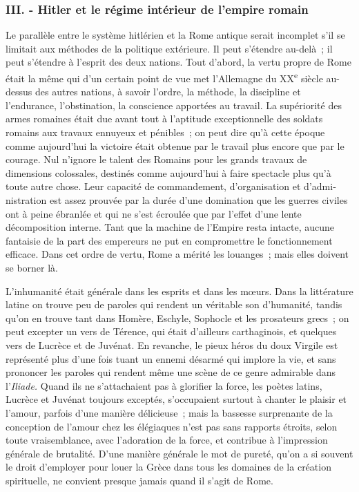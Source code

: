 \documentclass[french,twoside]{book} %
\begin{document}
\subsubsection[{III. - Hitler et le régime intérieur de l'empire romain}]{III. - Hitler et le régime intérieur de l'empire romain}
\noindent \par
Le parallèle entre le système hitlérien et la Rome antique serait incomplet s'il se limitait aux méthodes de la politique extérieure. Il peut s'étendre au-delà ; il peut s'étendre à l'esprit des deux nations. Tout d'abord, la vertu propre de Rome était la même qui d'un certain point de vue met l'Allemagne du XX\textsuperscript{e} siècle au-dessus des autres nations, à savoir l'ordre, la méthode, la discipline et l'endurance, l'obstination, la conscience apportées au travail. La supériorité des armes romaines était due avant tout à l'aptitude exceptionnelle des soldats romains aux travaux ennuyeux et pénibles ; on peut dire qu'à cette époque comme aujourd'hui la victoire était obtenue par le travail plus encore que par le courage. Nul n'ignore le talent des Romains pour les grands travaux de dimensions colossales, destinés comme aujourd'hui à faire spectacle plus qu'à toute autre chose. Leur capacité de commandement, d'organisation et d'admi­nistration est assez prouvée par la durée d'une domination que les guerres civiles ont à peine ébranlée et qui ne s'est écroulée que par l'effet d'une lente décomposition interne. Tant que la machine de l'Empire resta intacte, aucune fantaisie de la part des empereurs ne put en compromettre le fonctionnement efficace. Dans cet ordre de vertu, Rome a mérité les louanges ; mais elles doivent se borner là.\par
L'inhumanité était générale dans les esprits et dans les mœurs. Dans la littérature latine on trouve peu de paroles qui rendent un véritable son d'huma­nité, tandis qu'on en trouve tant dans Homère, Eschyle, Sophocle et les prosateurs grecs ; on peut excepter un vers de Térence, qui était d'ailleurs carthaginois, et quelques vers de Lucrèce et de Juvénat. En revanche, le pieux héros du doux Virgile est représenté plus d'une fois tuant un ennemi désarmé qui implore la vie, et sans prononcer les paroles qui rendent même une scène de ce genre admirable dans l'{\itshape Iliade.} Quand ils ne s'attachaient pas à glorifier la force, les poètes latins, Lucrèce et Juvénat toujours exceptés, s'occupaient surtout à chanter le plaisir et l'amour, parfois d'une manière délicieuse ; mais la bassesse surprenante de la conception de l'amour chez les élégiaques n'est pas sans rapports étroits, selon toute vraisemblance, avec l'adoration de la force, et contribue à l'impression générale de brutalité. D’une manière géné­rale le mot de pureté, qu'on a si souvent le droit d'employer pour louer la Grèce dans tous les domaines de la création spirituelle, ne convient presque jamais quand il s'agit de Rome.\par
\end{document}
